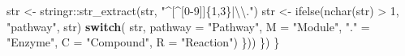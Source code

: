 \documentclass[
]{article}
\newenvironment{Shaded}{\begin{snugshade}}{\end{snugshade}}
\newcommand{\AttributeTok}[1]{\textcolor[rgb]{0.77,0.63,0.00}{#1}}
\newcommand{\ControlFlowTok}[1]{\textcolor[rgb]{0.13,0.29,0.53}{\textbf{#1}}}
\newcommand{\DecValTok}[1]{\textcolor[rgb]{0.00,0.00,0.81}{#1}}
\newcommand{\FunctionTok}[1]{\textcolor[rgb]{0.00,0.00,0.00}{#1}}
\newcommand{\NormalTok}[1]{#1}
\newcommand{\OtherTok}[1]{\textcolor[rgb]{0.56,0.35,0.01}{#1}}
\newcommand{\SpecialCharTok}[1]{\textcolor[rgb]{0.00,0.00,0.00}{#1}}
\newcommand{\StringTok}[1]{\textcolor[rgb]{0.31,0.60,0.02}{#1}}
\begin{document}
\begin{Shaded}
\begin{Highlighting}[]
\NormalTok{              str }\OtherTok{\textless{}{-}}\NormalTok{ stringr}\SpecialCharTok{::}\FunctionTok{str\_extract}\NormalTok{(str, }\StringTok{"\^{}[\^{}[0{-}9]]\{1,3\}|}\SpecialCharTok{\textbackslash{}\textbackslash{}}\StringTok{."}\NormalTok{)}
\NormalTok{              str }\OtherTok{\textless{}{-}} \FunctionTok{ifelse}\NormalTok{(}\FunctionTok{nchar}\NormalTok{(str) }\SpecialCharTok{\textgreater{}} \DecValTok{1}\NormalTok{, }\StringTok{"pathway"}\NormalTok{, str)}
              \ControlFlowTok{switch}\NormalTok{(}
\NormalTok{                str, }\AttributeTok{pathway =} \StringTok{"Pathway"}\NormalTok{,}
                \AttributeTok{M =} \StringTok{"Module"}\NormalTok{,}
                \StringTok{"."} \OtherTok{=} \StringTok{"Enzyme"}\NormalTok{,}
                \AttributeTok{C =} \StringTok{"Compound"}\NormalTok{,}
                \AttributeTok{R =} \StringTok{"Reaction"}\NormalTok{)}
\NormalTok{            \}))}
\NormalTok{      \})}
\NormalTok{\}}


\end{Highlighting}
\end{Shaded}
\end{document}
